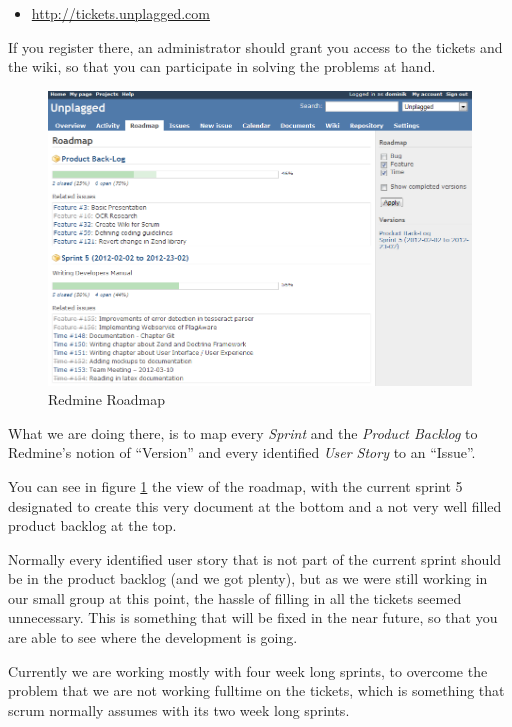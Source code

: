 \begin{itemize}
\item \url{http://tickets.unplagged.com}
\end{itemize}

If you register there, an administrator should grant you access to the tickets and the wiki, so that you can participate
in solving the problems at hand.

\begin{figure}[htbp]
  \centering
    \includegraphics[width=\textwidth]{images/roadmap.png}
  \caption{Redmine Roadmap}
  \label{fig:roadmap}
\end{figure}

What we are doing there, is to map every \textit{Sprint} and the \textit{Product Backlog} to Redmine's notion of \enquote{Version} and
every identified \textit{User Story} to an \enquote{Issue}.

You can see in figure \ref{fig:roadmap} the view of the roadmap, with the current sprint 5 designated to create this very
document at the bottom and a not very well filled product backlog at the top. 

Normally 
every identified user story that is not part of the current sprint should be in the product backlog (and we got plenty), 
but as we were still working
in our small group at this point, the hassle of filling in all the tickets seemed unnecessary. This is something that
will be fixed in the near future, so that you are able to see where the development is going.

Currently we are working mostly with four week long sprints, to overcome the problem that we are not working fulltime
on the tickets, which is something that scrum normally assumes with its two week long sprints.

